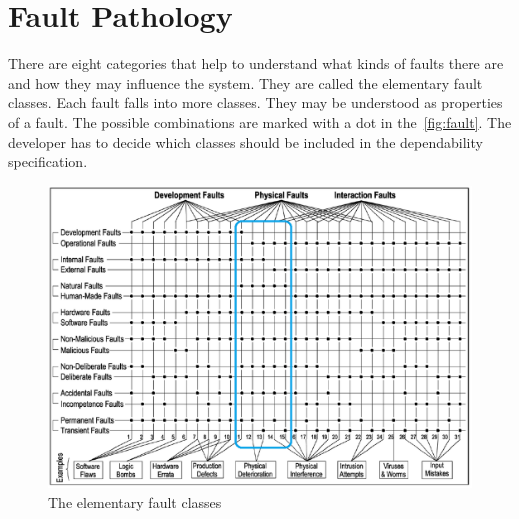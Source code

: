 \section{Fault Pathology}
There are eight categories that help to understand what kinds of faults there are and how they may influence the system. They are called the elementary fault classes. Each fault falls into more classes. They may be understood as properties of a fault. The possible combinations are marked with a dot in the~\autoref{fig:fault}. The developer has to decide which classes should be included in the dependability specification.

\begin{figure}[H]
\centering
\includegraphics[width=\textwidth]{figures/fault_classes.png}
\caption{The elementary fault classes~\cite{art:Avizienis}}
\label{fig:fault}
\end{figure}

